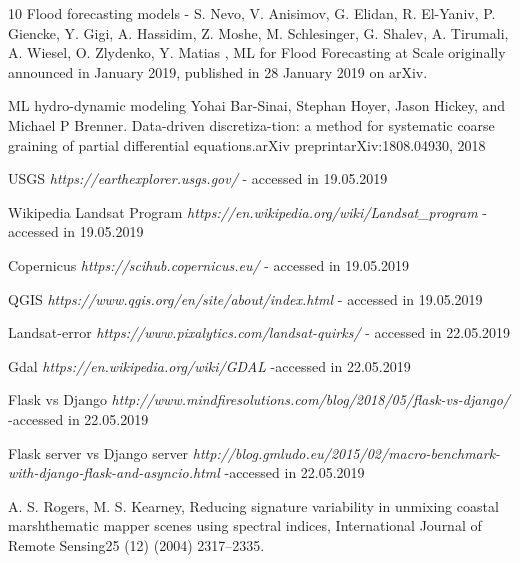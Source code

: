 \documentclass[12pt, a4paper]{report}
\begin{document}
\begin{thebibliography} {10}
Flood forecasting models - S. Nevo, V. Anisimov, G. Elidan, R. El-Yaniv, P. Giencke, Y. Gigi, A. Hassidim, Z. Moshe, M. Schlesinger, G. Shalev, A. Tirumali, A. Wiesel, O. Zlydenko, Y. Matias ,  ML for Flood Forecasting at Scale originally announced in January 2019, published in 28 January 2019 on arXiv.

ML hydro-dynamic modeling
Yohai Bar-Sinai, Stephan Hoyer, Jason Hickey, and Michael P Brenner. Data-driven discretiza-tion: a method for systematic coarse graining of partial differential equations.arXiv preprintarXiv:1808.04930, 2018


USGS \textit{https://earthexplorer.usgs.gov/} - accessed in 19.05.2019


Wikipedia Landsat Program \textit{https://en.wikipedia.org/wiki/Landsat\_program} - accessed in 19.05.2019

Copernicus \textit{https://scihub.copernicus.eu/} - accessed in 19.05.2019

QGIS \textit{https://www.qgis.org/en/site/about/index.html} - accessed in 19.05.2019

Landsat-error \textit{https://www.pixalytics.com/landsat-quirks/} - accessed in 22.05.2019

Gdal \textit{https://en.wikipedia.org/wiki/GDAL} -accessed in 22.05.2019

Flask vs Django \textit{http://www.mindfiresolutions.com/blog/2018/05/flask-vs-django/} -accessed in 22.05.2019

Flask server vs Django server \textit{http://blog.gmludo.eu/2015/02/macro-benchmark-with-django-flask-and-asyncio.html} -accessed in 22.05.2019

A. S. Rogers, M. S. Kearney, Reducing signature variability in unmixing coastal marshthematic mapper scenes using spectral indices, International Journal of Remote Sensing25 (12) (2004) 2317–2335.






\end{thebibliography}






\end{document}

